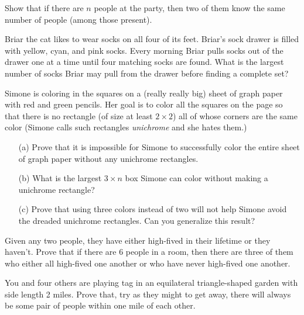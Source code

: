 \documentclass{article}
\begin{document}
\begin{exercise}
    Show that if there are \(n\) people at the party, then two of them know the same number of people (among those present).
\end{exercise}

\begin{exercise}
    Briar the cat likes to wear socks on all four of its feet. 
    Briar's sock drawer is filled with yellow, cyan, and pink socks. 
    Every morning Briar pulls socks out of the drawer one at a time until four matching socks are found. 
    What is the largest number of socks Briar may pull from the drawer before finding a complete set?
\end{exercise}

\begin{exercise}
    Simone is coloring in the squares on a (really really big) sheet of graph paper with red and green pencils. 
    Her goal is to color all the squares on the page so that there is no rectangle (of size at least \(2\times 2\)) all of whose corners are the same color (Simone calls such rectangles \textit{unichrome} and she hates them.) 
    \begin{enumerate}
        \item[(a)] Prove that it is impossible for Simone to successfully color the entire sheet of graph paper without any unichrome rectangles.
        \item[(b)] What is the largest \(3\times n\) box Simone can color without making a unichrome rectangle?
        \item[(c)] Prove that using three colors instead of two will not help Simone avoid the dreaded unichrome rectangles.
        Can you generalize this result?
    \end{enumerate}
\end{exercise}

\begin{exercise}
    Given any two people, they have either high-fived in their lifetime or they haven't.
    Prove that if there are 6 people in a room, then there are three of them who either all high-fived one another or who have never high-fived one another.
\end{exercise}

\begin{exercise}
    You and four others are playing tag in an equilateral triangle-shaped garden with side length 2 miles.
    Prove that, try as they might to get away, there will always be some pair of people within one mile of each other.
\end{exercise}
\end{document}
